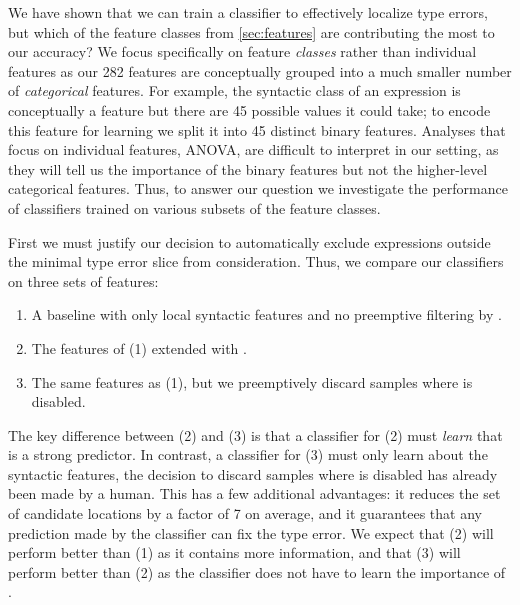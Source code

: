 \label{sec:feature-utility}
We have shown that we can train a classifier to effectively localize
type errors, but which of the feature classes from
\autoref{sec:features} are contributing the most to our accuracy?
%
We focus specifically on feature \emph{classes} rather than individual
features as our 282 features are conceptually grouped into a much
smaller number of \emph{categorical} features.
%
For example, the syntactic class of an expression is conceptually a
feature but there are 45 possible values it could take; to encode this
feature for learning we split it into 45 distinct binary features.
%
Analyses that focus on individual features, \eg \textsc{ANOVA},
are difficult to interpret in our setting, as they will tell us the
importance of the binary features but not the higher-level categorical
features.
%
Thus, to answer our question we investigate the performance of
classifiers trained on various subsets of the feature classes.

\label{sec:type-error-slice}
First we must justify our decision to automatically exclude expressions
outside the minimal type error slice from consideration.
%
%
Thus, we compare our classifiers on three sets of features:
%
\begin{enumerate}
\item A baseline with only local syntactic features and no
  preemptive filtering by \InSlice.
\item The features of (1) extended with \InSlice.
\item The same features as (1), but we preemptively discard samples
  where \InSlice is disabled.
\end{enumerate}
%
The key difference between (2) and (3) is that a classifier for (2) must
\emph{learn} that \InSlice is a strong predictor.
%
In contrast, a classifier for (3) must only learn about the syntactic
features, the decision to discard samples where \InSlice is disabled has
already been made by a human.
%
This has a few additional advantages: it reduces the set of candidate
locations by a factor of 7 on average, and it guarantees that any
prediction made by the classifier can fix the type error.
%
We expect that (2) will perform better than (1) as it contains more
information, and that (3) will perform better than (2) as the classifier
does not have to learn the importance of \InSlice.

